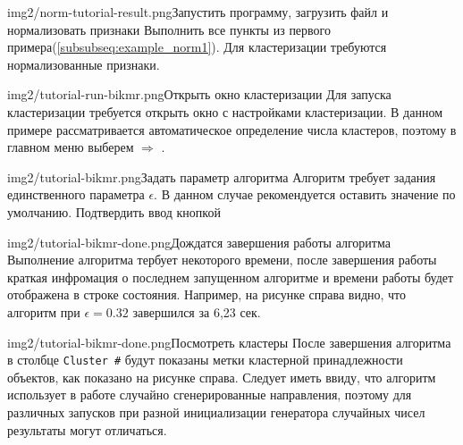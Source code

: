 \documentclass[12pt,tikz]{instruction}
\begin{document}
\begin{steps}
	\begin{ist}{img2/norm-tutorial-result.png}{Запустить программу, загрузить файл и нормализовать признаки}
		Выполнить все пункты из первого примера(\ref{subsubseq:example_norm1}). Для кластеризации требуются нормализованные признаки.		
	\end{ist}
	\begin{ist}{img2/tutorial-run-bikmr.png}{Открыть окно кластеризации}
		Для запуска кластеризации требуется открыть окно с настройками кластеризации. В данном примере рассматривается автоматическое определение числа кластеров, поэтому в главном меню выберем  $ \Rightarrow $ . 
	\end{ist}
	\begin{ist}{img2/tutorial-bikmr.png}{Задать параметр алгоритма}
		Алгоритм \BiKMR требует задания единственного параметра $ \epsilon $. В данном случае рекомендуется оставить значение по умолчанию. Подтвердить ввод кнопкой 
	\end{ist}
	\begin{ist}{img2/tutorial-bikmr-done.png}{Дождатся завершения работы алгоритма}
		Выполнение алгоритма тербует некоторого времени, после завершения работы краткая инфромация о последнем запущенном алгоритме и времени работы будет отображена в строке состояния. Например, на рисунке справа видно, что алгоритм \BiKMR при $ \epsilon=0.32 $ завершился за 6,23 сек.
	\end{ist}
	\begin{ist}{img2/tutorial-bikmr-done.png}{Посмотреть кластеры}
		После завершения алгоритма в столбце \texttt{Cluster \#} будут показаны метки кластерной принадлежности объектов, как показано на рисунке справа. Следует иметь ввиду, что алгоритм \BiKMR использует в работе случайно сгенерированные направления, поэтому для различных запусков при разной инициализации генератора случайных чисел результаты могут отличаться.
	\end{ist}
	

\end{steps}
\end{document}
